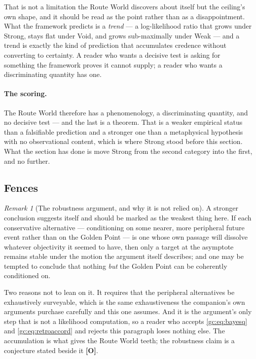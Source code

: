 \documentclass[11pt]{article}
\numberwithin{equation}{section}
\theoremstyle{plain}
\theoremstyle{definition}
\theoremstyle{remark}
\newtheorem{remark}[theorem]{Remark}
\begin{document}
That is not a limitation the Route World discovers about itself but the
ceiling's own shape, and it should be read as the point rather than as a
disappointment. What the framework predicts is a \emph{trend} --- a
log-likelihood ratio that grows under Strong, stays flat under Void, and
grows sub-maximally under Weak --- and a trend is exactly the kind of
prediction that accumulates credence without converting to certainty. A
reader who wants a decisive test is asking for something the framework
proves it cannot supply; a reader who wants a discriminating quantity has
one.

\paragraph{The scoring.} The Route World therefore has a phenomenology, a
discriminating quantity, and no decisive test --- and the last is a
theorem. That is a weaker empirical status than a falsifiable prediction
and a stronger one than a metaphysical hypothesis with no observational
content, which is where Strong stood before this section. What the
section has done is move Strong from the second category into the first,
and no further.

\subsection{Fences}\label{gc:sub:routefences}

\begin{remark}[The robustness argument, and why it is not relied on]
\label{gc:rem:routerobust}
A stronger conclusion suggests itself and should be marked as the
weakest thing here. If each conservative alternative --- conditioning on
some nearer, more peripheral future event rather than on the Golden
Point --- is one whose own passage will dissolve whatever objectivity it
seemed to have, then only a target at the asymptote remains stable under
the motion the argument itself describes; and one may be tempted to
conclude that nothing \emph{but} the Golden Point can be coherently
conditioned on.

Two reasons not to lean on it. It requires that the peripheral
alternatives be exhaustively surveyable, which is the same
exhaustiveness the companion's own arguments purchase carefully and this
one assumes. And it is the argument's only step that is not a
likelihood computation, so a reader who accepts \eqref{gc:eq:bayesq} and
\eqref{gc:eq:retroaccord} and rejects this paragraph loses nothing else.
The accumulation is what gives the Route World teeth; the robustness
claim is a conjecture stated beside it \textbf{[O]}.
\end{remark}
\end{document}
